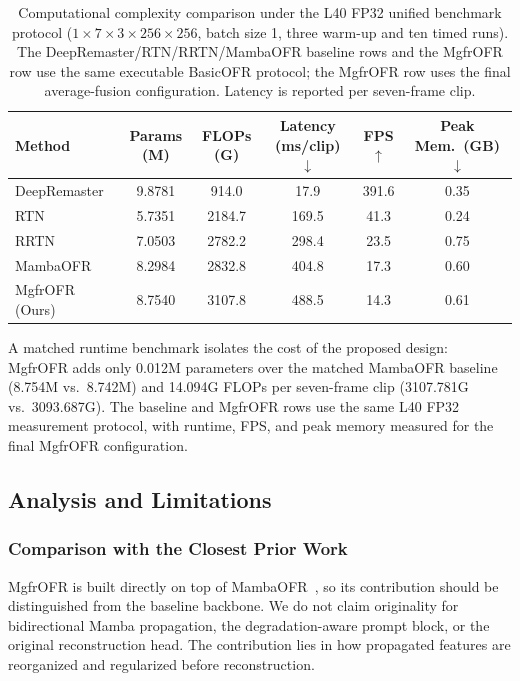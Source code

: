 \documentclass[symmetry,article,submit,pdftex,moreauthors]{Definitions/mdpi}
\begin{document}
\begin{table}[htbp]
\caption{Computational complexity comparison under the L40 FP32 unified benchmark protocol ($1{\times}7{\times}3{\times}256{\times}256$, batch size 1, three warm-up and ten timed runs). The DeepRemaster/RTN/RRTN/MambaOFR baseline rows and the MgfrOFR row use the same executable BasicOFR protocol; the MgfrOFR row uses the final average-fusion configuration. Latency is reported per seven-frame clip.\label{tab:complexity}}
\begin{tabularx}{\textwidth}{lCCCCC}
\toprule
\textbf{Method} & \textbf{Params (M)} & \textbf{FLOPs (G)} & \textbf{Latency (ms/clip)$\downarrow$} & \textbf{FPS$\uparrow$} & \textbf{Peak Mem.\ (GB)$\downarrow$} \\
\midrule
DeepRemaster~\cite{iizuka2019deepremaster}   & 9.8781 & 914.0  & 17.9  & 391.6 & 0.35 \\
RTN~\cite{wan2022rtn}                        & 5.7351 & 2184.7 & 169.5 & 41.3  & 0.24 \\
RRTN~\cite{lin2024rrtn}                      & 7.0503 & 2782.2 & 298.4 & 23.5  & 0.75 \\
MambaOFR~\cite{mao2025mambaofr}              & 8.2984 & 2832.8 & 404.8 & 17.3  & 0.60 \\
\midrule
MgfrOFR (Ours)                              & 8.7540 & 3107.8 & 488.5 & 14.3  & 0.61 \\
\bottomrule
\end{tabularx}
\end{table}

A matched runtime benchmark isolates the cost of the proposed design: MgfrOFR adds only 0.012M parameters over the matched MambaOFR baseline (8.754M vs.\ 8.742M) and 14.094G FLOPs per seven-frame clip (3107.781G vs.\ 3093.687G). The baseline and MgfrOFR rows use the same L40 FP32 measurement protocol, with runtime, FPS, and peak memory measured for the final MgfrOFR configuration.

\FloatBarrier
\subsection{Analysis and Limitations}
\label{subsec:analysis_limitations}

\subsubsection{Comparison with the Closest Prior Work}
\label{subsec:vs_mambaofr}

MgfrOFR is built directly on top of MambaOFR~\cite{mao2025mambaofr}, so its contribution should be distinguished from the baseline backbone. We do not claim originality for bidirectional Mamba propagation, the degradation-aware prompt block, or the original reconstruction head. The contribution lies in how propagated features are reorganized and regularized before reconstruction.
\end{document}
